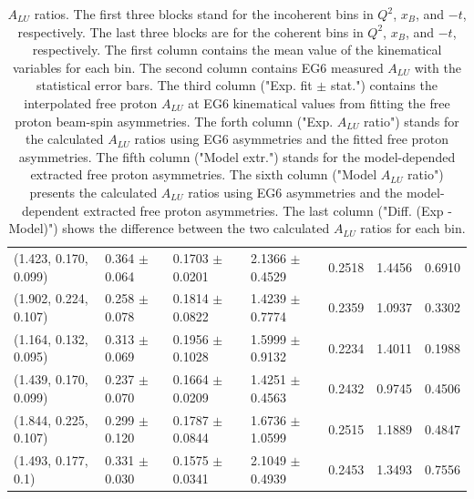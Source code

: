\begin{landscape}
\begin{table}[!h]
\begin{center}
\begin{tabular}{||l|l|l|l|l|l|l||}
 (1.423, 0.170, 0.099) &  0.364 $\pm$ 0.064 & 0.1703 $\pm$ 0.0201 & 2.1366 $\pm$ 0.4529 & 0.2518 & 1.4456 &  0.6910 \\
 (1.902, 0.224, 0.107) &  0.258 $\pm$ 0.078 & 0.1814 $\pm$ 0.0822 & 1.4239 $\pm$ 0.7774 & 0.2359 & 1.0937 &  0.3302 \\
     \hline \hline  \hline
 (1.164, 0.132, 0.095) &  0.313 $\pm$ 0.069 & 0.1956 $\pm$ 0.1028 & 1.5999 $\pm$ 0.9132 & 0.2234 & 1.4011 &  0.1988 \\
 (1.439, 0.170, 0.099) &  0.237 $\pm$ 0.070 & 0.1664 $\pm$ 0.0209 & 1.4251 $\pm$ 0.4563 & 0.2432 & 0.9745 &  0.4506 \\
 (1.844, 0.225, 0.107) &  0.299 $\pm$ 0.120 & 0.1787 $\pm$ 0.0844 & 1.6736 $\pm$ 1.0599 & 0.2515 & 1.1889 &  0.4847 \\
      \hline  \hline  \hline
 (1.493, 0.177, 0.1)   &  0.331 $\pm$ 0.030 & 0.1575 $\pm$ 0.0341 & 2.1049 $\pm$ 0.4939 & 0.2453 & 1.3493 &  0.7556 \\                                                               
 
 \hline
 \end{tabular}
 \caption{$A_{LU}$ ratios. The first three blocks stand for the incoherent bins 
 in $Q^{2}$, $x_{B}$, and $-t$, respectively. The last three blocks are for the 
 coherent bins in $Q^{2}$, $x_{B}$, and $-t$, respectively. The first column 
 contains the mean value of the kinematical variables for each bin. The second 
 column contains EG6 measured $A_{LU}$ with the statistical error bars. The 
 third column ("Exp. fit $\pm$ stat.") contains the interpolated free proton 
 $A_{LU}$ at EG6 kinematical values from fitting the free proton beam-spin 
 asymmetries. The forth column ("Exp. $A_{LU}$ ratio") stands for the 
 calculated $A_{LU}$ ratios using EG6 asymmetries and the fitted free proton 
 asymmetries. The fifth column ("Model extr.") stands for the model-depended 
 extracted free proton asymmetries. The sixth column ("Model $A_{LU}$ ratio") 
 presents the calculated $A_{LU}$ ratios using EG6 asymmetries and the 
 model-dependent extracted free proton asymmetries. The last column ("Diff.  
 (Exp - Model)") shows the difference between the two calculated $A_{LU}$ 
 ratios for each bin.}
 \label{table:ALU_ratios_}
 \end{center}
\end{table}
\end{landscape}





